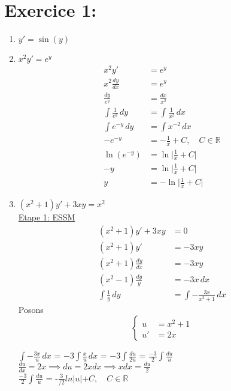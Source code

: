 \documentclass[a4paper,12pt]{article}
\begin{document}
\section*{Exercice 1:}
\begin{enumerate}
	\item $y' = \sin(y)$

	\item $x^2 y' = e^y$ \\
		\begin{align*}
			x^2 y' &= e^y \\
			x^2 \frac{dy}{dx} &= e^y \\
			\frac{dy}{e^y} &= \frac{dx}{x^2} \\
			\int \frac{1}{e^{y}} \, dy &= \int \frac{1}{x^{2}} \, dx \\
			\int e^{-y}\,dy &= \int x^{-2} \, dx \\
			-e^{-y} &= -\frac{1}{x} + C, \quad C \in \mathbb{R} \\
			\ln(e^{-y}) &= \ln \lvert \frac{1}{x} + C \rvert \\
			-y &= \ln \lvert \frac{1}{x} + C \rvert \\
			y &= -\ln \lvert \frac{1}{x} + C \rvert
		\end{align*}


	\item $(x^2 + 1) y' + 3xy = x^2$ \\
		\underline{Etape 1: ESSM} \\
		\begin{align*}
			(x^2+1)y' + 3xy &= 0  \\
			(x^2+1)y' &= -3xy  \\
			(x^2+1) \frac{dy}{dx} &= -3xy \\
			(x^2-1) \frac{dy}{y} &= -3x \,dx \\
			\int \frac{1}{y} \, dy &= \int -\frac{3x}{x^2+1} \, dx
		\end{align*}
		Posons \\
		\[
		\left\{
		\begin{aligned}
			u &= x^2 + 1 \\
			u' &= 2x
		\end{aligned}
		\right.
		\]
		
		
		$\int -\frac{3x}{u} \, dx$ = $-3 \int \frac{x}{u} \, dx$ = $-3 \int \frac{du}{2u} $ = $\frac{-3}{2} \int \frac{du}{u}$ \\
		
		$\frac{du}{dx} = 2x \implies du=2xdx \implies xdx = \frac{du}{2}$ \\
		$\frac{-3}{2} \int \frac{du}{u}$ = -$\frac{3}{/2} ln \lvert u \lvert + C, \quad C \in \mathbb{R} $\\
		

\end{enumerate}
\end{document}

